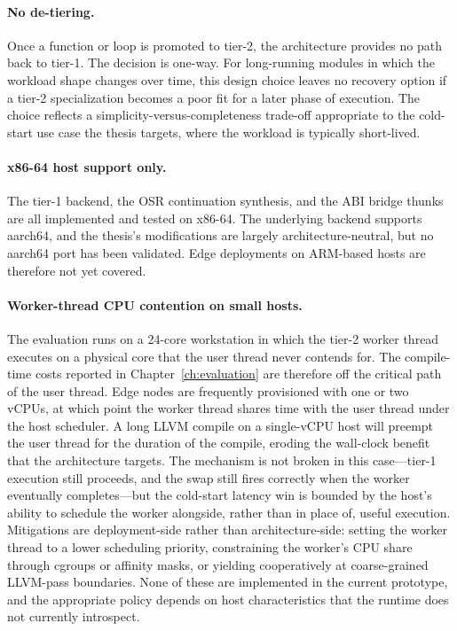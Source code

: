 \paragraph{No de-tiering.} Once a function or loop is promoted to tier-2, the architecture provides no path back to tier-1. The decision is one-way. For long-running modules in which the workload shape changes over time, this design choice leaves no recovery option if a tier-2 specialization becomes a poor fit for a later phase of execution. The choice reflects a simplicity-versus-completeness trade-off appropriate to the cold-start use case the thesis targets, where the workload is typically short-lived.

\paragraph{x86-64 host support only.} The tier-1 backend, the OSR continuation synthesis, and the ABI bridge thunks are all implemented and tested on x86-64. The underlying backend supports aarch64, and the thesis's modifications are largely architecture-neutral, but no aarch64 port has been validated. Edge deployments on ARM-based hosts are therefore not yet covered.

\paragraph{Worker-thread CPU contention on small hosts.} The evaluation runs on a 24-core workstation in which the tier-2 worker thread executes on a physical core that the user thread never contends for. The compile-time costs reported in Chapter~\ref{ch:evaluation} are therefore off the critical path of the user thread. Edge nodes are frequently provisioned with one or two vCPUs, at which point the worker thread shares time with the user thread under the host scheduler. A long LLVM compile on a single-vCPU host will preempt the user thread for the duration of the compile, eroding the wall-clock benefit that the architecture targets. The mechanism is not broken in this case---tier-1 execution still proceeds, and the swap still fires correctly when the worker eventually completes---but the cold-start latency win is bounded by the host's ability to schedule the worker alongside, rather than in place of, useful execution. Mitigations are deployment-side rather than architecture-side: setting the worker thread to a lower scheduling priority, constraining the worker's CPU share through cgroups or affinity masks, or yielding cooperatively at coarse-grained LLVM-pass boundaries. None of these are implemented in the current prototype, and the appropriate policy depends on host characteristics that the runtime does not currently introspect.

